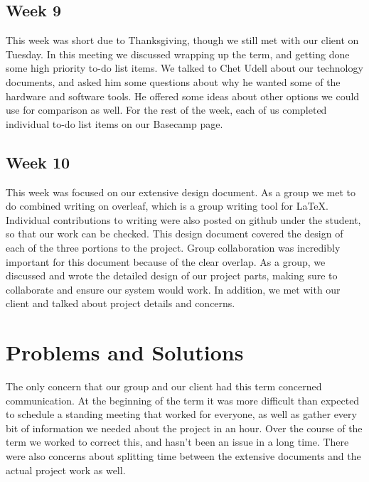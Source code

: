 \documentclass[onecolumn, draftclsnofoot,10pt, compsoc]{IEEEtran}
\begin{document}
    \subsection{Week 9}
    This week was short due to Thanksgiving, though we still met with our client on Tuesday. 
    In this meeting we discussed wrapping up the term, and getting done some high priority to-do list items. 
    We talked to Chet Udell about our technology documents, and asked him some questions about why he wanted some of the hardware and software tools.
    He offered some ideas about other options we could use for comparison as well. 
    For the rest of the week, each of us completed individual to-do list items on our Basecamp page. 
    
    \subsection{Week 10}
    This week was focused on our extensive design document. 
    As a group we met to do combined writing on overleaf, which is a group writing tool for LaTeX. 
    Individual contributions to writing were also posted on github under the student, so that our work can be checked. 
    This design document covered the design of each of the three portions to the project.
    Group collaboration was incredibly important for this document because of the clear overlap. 
    As a group, we discussed and wrote the detailed design of our project parts, making sure to collaborate and ensure our system would work.
    In addition, we met with our client and talked about project details and concerns.
    
    \section{Problems and Solutions}
    The only concern that our group and our client had this term concerned communication. 
    At the beginning of the term it was more difficult than expected to schedule a standing meeting that worked for everyone, as well as gather every bit of information we needed about the project in an hour.
    Over the course of the term we worked to correct this, and hasn't been an issue in a long time.    
    There were also concerns about splitting time between the extensive documents and the actual project work as well.
    \pagebreak
    
\end{document}
